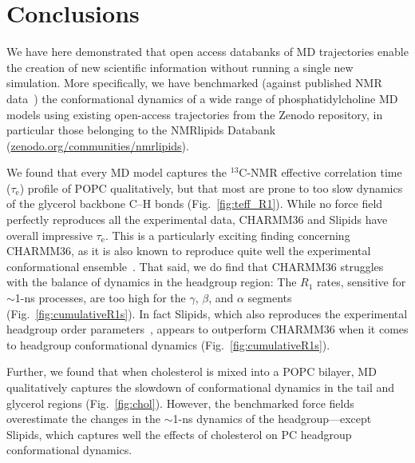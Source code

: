\documentclass[journal=jcisd8,manuscript=article,layout=twocolumn]{achemso}
\begin{document}
\section{Conclusions}
We have here demonstrated that
open access databanks of MD trajectories enable the creation of new scientific information without running a single new simulation.
More specifically, we have bench\-marked (against published NMR data~\cite{ferreira15,pham15,Volke:1995a,Antila:2020a}) the conformational
dynamics of a wide range of phosphatidylcholine MD models using existing open-access trajectories from the Zenodo repository, in particular those belonging to the NMRlipids Databank (\url{zenodo.org/communities/nmrlipids}).

We found that every MD model captures the $^{13}$C-NMR effective correlation time ($\tau_\mathrm e$) profile of POPC qualitatively, %
but that most are prone to too slow dynamics of the glycerol backbone C--H bonds (Fig.~\ref{fig:teff_R1}).
%
While no force field perfectly reproduces all the experimental data,
CHARMM36 and Slipids have overall impressive $\tau_\mathrm e$.
This is a particularly exciting finding concerning CHARMM36,
%
as it is also known to reproduce quite well the experimental conformational ensemble~\cite{botan15}.
%
That said, we do find that CHARMM36 struggles with the balance of dynamics in the headgroup region:
The $R_1$ rates, sensitive for $\sim$1-ns processes, are too high for the $\gamma$, $\beta$, and $\alpha$ segments (Fig.~\ref{fig:cumulativeR1s}).
In fact Slipids, which also
reproduces the experimental headgroup order parameters~\cite{botan15},
appears to outperform CHARMM36 when it comes to headgroup conformational dynamics (Fig.~\ref{fig:cumulativeR1s}).

%
Further, we found that
when cholesterol is mixed into a POPC bilayer,
MD qualitatively captures the slowdown of conformational dynamics in the tail and glycerol regions (Fig.~\ref{fig:chol}). However, the benchmarked force fields overestimate the changes in the $\sim$1-ns dynamics of the headgroup---except
%
Slipids, which captures well the effects of cholesterol on PC headgroup conformational dynamics.
\end{document}
